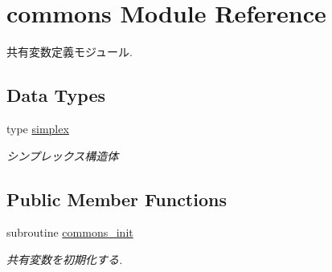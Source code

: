 \hypertarget{classcommons}{\section{commons Module Reference}
\label{classcommons}
}


共有変数定義モジュール.  


\subsection*{Data Types}
\begin{DoxyCompactItemize}
\item 
type \hyperlink{structcommons_1_1simplex}{simplex}
\begin{DoxyCompactList}\small\item\em シンプレックス構造体 \end{DoxyCompactList}\end{DoxyCompactItemize}
\subsection*{Public Member Functions}
\begin{DoxyCompactItemize}
\item 
\hypertarget{classcommons_a35b719342309a1ff6511aa71935638d2}{subroutine \hyperlink{classcommons_a35b719342309a1ff6511aa71935638d2}{commons\-\_\-init}}\label{classcommons_a35b719342309a1ff6511aa71935638d2}

\begin{DoxyCompactList}\small\item\em 共有変数を初期化する. \end{DoxyCompactList}\end{DoxyCompactItemize}
